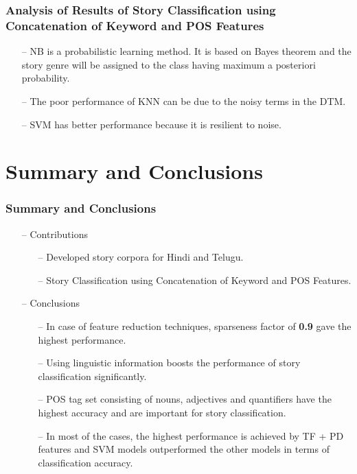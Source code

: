 \documentclass{beamer}
\begin{document}
\begin{frame} \label{Concatenation of keyword and POS}
\frametitle{Analysis of Results of Story Classification using Concatenation of Keyword and POS Features}

\begin{itemize}
\item[--] NB is a probabilistic learning method. It is based on Bayes theorem and the story genre will be assigned to the class having maximum a posteriori probability.
\item[--] The poor performance of KNN can be due to the noisy terms in the DTM.
\item[--] SVM has better performance because it is resilient to noise.
\end{itemize}

\hyperlink{Confusion Matrix}{\beamergotobutton{}} 

\end{frame}


\section{Summary and Conclusions}

\begin{frame}
\frametitle{Summary and Conclusions}
\begin{itemize}
\item[--] Contributions
\begin{itemize}
\item[--] Developed story corpora for Hindi and Telugu.
\item[--] Story Classification using Concatenation of Keyword and POS Features.
\end{itemize}
\item[--] Conclusions
\begin{itemize}
\item[--] In case of feature reduction techniques, sparseness factor of \textbf{0.9} gave the highest performance.
\item[--] Using linguistic information boosts the performance of story classification significantly.
\item[--] POS tag set consisting of nouns, adjectives and quantifiers have the highest accuracy and are important for story classification.
\item[--] In most of the cases, the highest performance is achieved by TF + PD features and SVM models outperformed the other models in terms of classification accuracy.
\end{itemize}
\end{itemize}
\end{frame}
\end{document}
